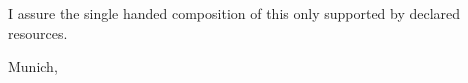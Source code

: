 \thispagestyle{empty}
\vspace*{0.8\textheight}
\noindent
I assure the single handed composition of this \MakeLowercase{\getDoctype{}} only supported by declared resources.

\vspace{15mm}
\noindent
Munich, \getSubmissionDate{} \hspace{5cm} \getAuthor{}

\cleardoublepage{}
